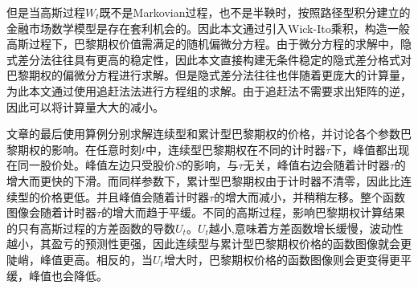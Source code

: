 \documentclass{ctexart} %
\begin{document}
但是当高斯过程$W_t$既不是Markovian过程，也不是半鞅时，按照路径型积分建立的金融市场数学模型是存在套利机会的。因此本文通过引入Wick-Ito乘积，构造一般高斯过程下，巴黎期权价值需满足的随机偏微分方程。由于微分方程的求解中，隐式差分法往往具有更高的稳定性，因此本文直接构建无条件稳定的隐式差分格式对巴黎期权的偏微分方程进行求解。但是隐式差分法往往也伴随着更庞大的计算量，为此本文通过使用追赶法法进行方程组的求解。由于追赶法不需要求出矩阵的逆，因此可以将计算量大大的减小。

文章的最后使用算例分别求解连续型和累计型巴黎期权的价格，并讨论各个参数巴黎期权的影响。在任意时刻$t$中，连续型巴黎期权在不同的计时器$\tau$下，峰值都出现在同一股价处。峰值左边只受股价$S$的影响，与$\tau$无关，峰值右边会随着计时器$\tau$的增大而更快的下滑。而同样参数下，累计型巴黎期权由于计时器不清零，因此比连续型的价格更低。并且峰值会随着计时器$\tau$的增大而减小，并稍稍左移。整个函数图像会随着计时器$\tau$的增大而趋于平缓。不同的高斯过程，影响巴黎期权计算结果的只有高斯过程的方差函数的导数$U_t$。$U_t$越小,意味着方差函数增长缓慢，波动性越小，其盈亏的预测性更强，因此连续型与累计型巴黎期权价格的函数图像就会更陡峭，峰值更高。相反的，当$U_t$增大时，巴黎期权价格的函数图像则会更变得更平缓，峰值也会降低。
\end{document}
